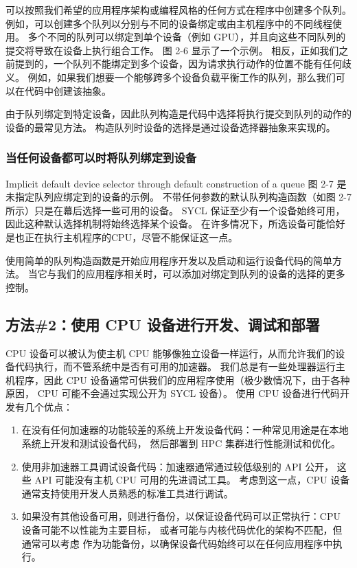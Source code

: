 可以按照我们希望的应用程序架构或编程风格的任何方式在程序中创建多个队列。 
例如，可以创建多个队列以分别与不同的设备绑定或由主机程序中的不同线程使用。 
多个不同的队列可以绑定到单个设备（例如 GPU），并且向这些不同队列的提交将导致在设备上执行组合工作。 
图 2-6 显示了一个示例。 相反，正如我们之前提到的，一个队列不能绑定到多个设备，因为请求执行动作的位置不能有任何歧义。 
例如，如果我们想要一个能够跨多个设备负载平衡工作的队列，那么我们可以在代码中创建该抽象。

由于队列绑定到特定设备，因此队列构造是代码中选择将执行提交到队列的动作的设备的最常见方法。 
构造队列时设备的选择是通过设备选择器抽象来实现的。

\subsubsection{当任何设备都可以时将队列绑定到设备}
{\color{red} Implicit default device selector through default construction of a queue }
图 2-7 是未指定队列应绑定到的设备的示例。 不带任何参数的默认队列构造函数（如图 2-7 所示）只是在幕后选择一些可用的设备。 
SYCL 保证至少有一个设备始终可用，因此这种默认选择机制将始终选择某个设备。 
在许多情况下，所选设备可能恰好是也正在执行主机程序的CPU，尽管不能保证这一点。

使用简单的队列构造函数是开始应用程序开发以及启动和运行设备代码的简单方法。 
当它与我们的应用程序相关时，可以添加对绑定到队列的设备的选择的更多控制。

\subsection{方法\#2：使用 CPU 设备进行开发、调试和部署}
CPU 设备可以被认为使主机 CPU 能够像独立设备一样运行，从而允许我们的设备代码执行，而不管系统中是否有可用的加速器。 
我们总是有一些处理器运行主机程序，因此 CPU 设备通常可供我们的应用程序使用（极少数情况下，由于各种原因，
CPU 可能不会通过实现公开为 SYCL 设备）。 使用 CPU 设备进行代码开发有几个优点：

\begin{enumerate}
	\item 在没有任何加速器的功能较差的系统上开发设备代码：一种常见用途是在本地系统上开发和测试设备代码，
	然后部署到 HPC 集群进行性能测试和优化。

	\item 使用非加速器工具调试设备代码：加速器通常通过较低级别的 API 公开，
	这些 API 可能没有主机 CPU 可用的先进调试工具。 考虑到这一点，CPU 设备通常支持使用开发人员熟悉的标准工具进行调试。

	\item 如果没有其他设备可用，则进行备份，以保证设备代码可以正常执行：CPU 设备可能不以性能为主要目标，
	或者可能与内核代码优化的架构不匹配，但通常可以考虑 作为功能备份，以确保设备代码始终可以在任何应用程序中执行。
\end{enumerate}

